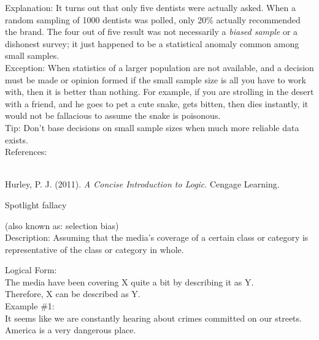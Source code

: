 \documentclass[a4paper,12pt,single,pdftex]{scrartcl}
\begin{document}
{    
      Explanation: It turns out that only five dentists were actually asked.  When a random sampling of 1000 dentists was polled, only 20\% actually recommended the brand.  The four out of five result was not necessarily a {\it biased sample} or a dishonest survey; it just happened to be a statistical anomaly common among small samples.
    \\

    
      Exception: When statistics of a larger population are not available, and a decision must be made or opinion formed if the small sample size is all you have to work with, then it is better than nothing.  For example, if you are strolling in the desert with a friend, and he goes to pet a cute snake, gets bitten, then dies instantly, it would not be fallacious to assume the snake is poisonous.
    \\

    
      Tip: Don’t base decisions on small sample sizes when much more reliable data exists.
    \\

    References:

    
      
        
      \\

      
        
          Hurley, P. J. (2011). {\it A Concise Introduction to Logic}. Cengage Learning.
        
      
    
  }


Spotlight fallacy
    
      (also known as: selection bias)
    \\

  
    Description: Assuming that the media’s coverage of a certain class or category is representative of the class or category in whole.

    
      Logical Form:
    \\

    
      The media have been covering X quite a bit by describing it as Y.
    \\

    
      Therefore, X can be described as Y.
    \\

    
      Example \#1:
    \\

    
      It seems like we are constantly hearing about crimes committed on our streets.  America is a very dangerous place.
    \\
\end{document}
